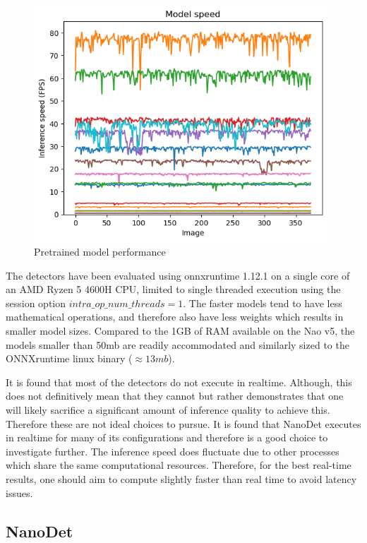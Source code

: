 \documentclass[a4paper,twoside,12pt]{report}
\begin{document}
\begin{figure}[h!]
\begin{center}
\includegraphics[width=11cm]{images/modelspeed.png}
\caption{Pretrained model performance}
\label{fig:modelspeed}
\end{center}
\end{figure}

The detectors have been evaluated using onnxruntime 1.12.1 on a single core of an AMD Ryzen 5 4600H CPU, limited to single threaded execution using the session option $intra\_op\_num\_threads = 1$. The faster models tend to have less mathematical operations, and therefore also have less weights which results in smaller model sizes. Compared to the 1GB of RAM available on the Nao v5, the models smaller than 50mb are readily accommodated and similarly sized to the ONNXruntime linux binary ($\approx13mb$).

It is found that most of the detectors do not execute in realtime. Although, this does not definitively mean that they cannot but rather demonstrates that one will likely sacrifice a significant amount of inference quality to achieve this. Therefore these are not ideal choices to pursue. It is found that NanoDet executes in realtime for many of its configurations and therefore is a good choice to investigate further. The inference speed does fluctuate due to other processes which share the same computational resources. Therefore, for the best real-time results, one should aim to compute slightly faster than real time to avoid latency issues. 

\subsection{NanoDet}
\end{document}
